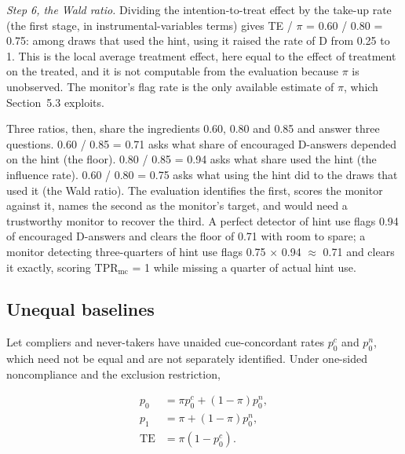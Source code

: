 \documentclass[11pt]{article}
\begin{document}
\emph{Step 6, the Wald ratio.} Dividing the intention-to-treat effect by the take-up rate (the first stage, in instrumental-variables terms) gives TE / $\pi$ = 0.60 / 0.80 = 0.75: among draws that used the hint, using it raised the rate of D from 0.25 to 1. This is the local average treatment effect, here equal to the effect of treatment on the treated, and it is not computable from the evaluation because $\pi$ is unobserved. The monitor’s flag rate is the only available estimate of $\pi$, which Section~5.3 exploits.

Three ratios, then, share the ingredients 0.60, 0.80 and 0.85 and answer three questions. 0.60 / 0.85 = 0.71 asks what share of encouraged D-answers depended on the hint (the floor). 0.80 / 0.85 = 0.94 asks what share used the hint (the influence rate). 0.60 / 0.80 = 0.75 asks what using the hint did to the draws that used it (the Wald ratio). The evaluation identifies the first, scores the monitor against it, names the second as the monitor’s target, and would need a trustworthy monitor to recover the third. A perfect detector of hint use flags 0.94 of encouraged D-answers and clears the floor of 0.71 with room to spare; a monitor detecting three-quarters of hint use flags 0.75 $\times$ 0.94 $\approx$ 0.71 and clears it exactly, scoring $\mathrm{TPR}_{\mathrm{mc}}$ = 1 while missing a quarter of actual hint use.

\subsection{Unequal baselines}
Let compliers and never-takers have unaided cue-concordant rates $p_0^{c}$ and $p_0^{n}$, which need not be equal and are not separately identified. Under one-sided noncompliance and the exclusion restriction,

\begin{align*}
  p_0 &= \pi  p_0^{c} + (1 - \pi ) p_0^{n}, \\
  p_1 &= \pi  + (1 - \pi ) p_0^{n}, \\
  \mathrm{TE} &= \pi  (1 - p_0^{c}).
\end{align*}
\end{document}

